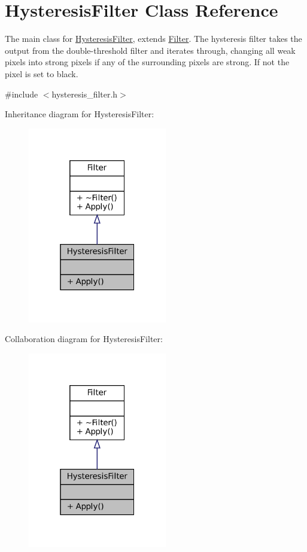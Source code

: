 \hypertarget{classHysteresisFilter}{}\section{Hysteresis\+Filter Class Reference}
\label{classHysteresisFilter}


The main class for \hyperlink{classHysteresisFilter}{Hysteresis\+Filter}, extends \hyperlink{classFilter}{Filter}. The hysteresis filter takes the output from the double-\/threshold filter and iterates through, changing all \textquotesingle{}weak\textquotesingle{} pixels into \textquotesingle{}strong\textquotesingle{} pixels if any of the surrounding pixels are \textquotesingle{}strong.\textquotesingle{} If not the pixel is set to black.  




{\ttfamily \#include $<$hysteresis\+\_\+filter.\+h$>$}



Inheritance diagram for Hysteresis\+Filter\+:\nopagebreak
\begin{figure}[H]
\begin{center}
\leavevmode
\includegraphics[width=172pt]{classHysteresisFilter__inherit__graph}
\end{center}
\end{figure}


Collaboration diagram for Hysteresis\+Filter\+:\nopagebreak
\begin{figure}[H]
\begin{center}
\leavevmode
\includegraphics[width=172pt]{classHysteresisFilter__coll__graph}
\end{center}
\end{figure}
